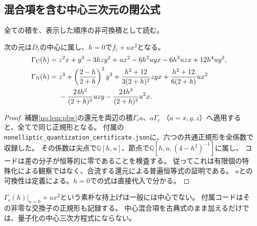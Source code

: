 \subsection{混合項を含む中心三次元の閉公式}
全ての積を、表示した順序の非可換積として読む。
\begin{proposition}[第一ブロックの中心元]\label{nq:prop:center}
次の元は$D_\epsilon$の中心に属し、$h=0$で$f_\epsilon+ux^2$となる。
\begin{align}
 \Gamma_{\mathrm C}(h)={}&
 z^2x+y^3-3hzy^2+ux^2
 -6h^2uyx-6h^3uzx+12h^4uy^2,
 \label{nq:eq:centerC}\\
 \Gamma_{\mathrm N}(h)={}&
 z^3+\left(\frac{2-h}{2+h}\right)^3y^3
 +\frac{h^2+12}{3(2+h)^2}zyx
 +\frac{h^2+12}{6(2+h)}ux^2\notag\\
 &-\frac{24h^2}{(2+h)^2}uzy
 -\frac{24h^3}{(2+h)^2}u^2x.
 \label{nq:eq:centerN}
\end{align}
\end{proposition}
\begin{proof}
補題\ref{nq:lem:pbw}の還元を両辺の積$\Gamma_\epsilon a$、$a\Gamma_\epsilon$
（$a=x,y,z$）へ適用すると、全てで同じ正規形となる。
付属の\texttt{nonelliptic\_quantization\_certificate.json}に、六つの共通正規形を全係数で収録した。
その係数は尖点で$\mathbb Q[h,u]$、節点で$\mathbb Q[h,u,(4-h^2)^{-1}]$に属し、
コードは差の分子が恒等的に零であることを検査する。
従ってこれは有限個の特殊化による観察ではなく、合流する還元による普遍恒等式の証明である。
$u$との可換性は定義による。$h=0$での式は直接代入で分かる。
\end{proof}
\begin{remark}[量子的な混合補正の必要性]
$\Gamma_\epsilon(h)|_{u=0}+ux^2$という素朴な持上げは一般には中心でない。
付属コードはその非零な交換子の正規形も記録する。
中心混合項を古典式のまま加えるだけでは、量子化の中心三次方程式にならない。
\end{remark}

